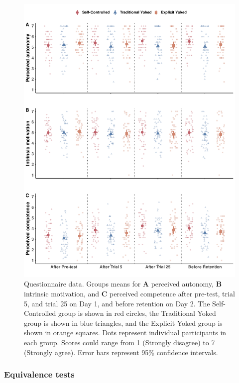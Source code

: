 \documentclass[
  english,
  man, donotrepeattitle,floatsintext]{apa7}
\begin{document}
\begin{figure}

{\centering \includegraphics[height=0.72\textheight]{../../figs/fig2} 

}

\caption{Questionnaire data. Groups means for \textbf{A} perceived autonomy, \textbf{B} intrinsic motivation, and \textbf{C} perceived competence after pre-test, trial 5, and trial 25 on Day 1, and before retention on Day 2. The Self-Controlled group is shown in red circles, the Traditional Yoked group is shown in blue triangles, and the Explicit Yoked group is shown in orange squares. Dots represent individual participants in each group. Scores could range from 1 (Strongly disagree) to 7 (Strongly agree). Error bars represent 95\% confidence intervals.}\label{fig:fig2}
\end{figure}

\hypertarget{equivalence-tests}{%
\subsubsection{Equivalence tests}\label{equivalence-tests}}
\end{document}
